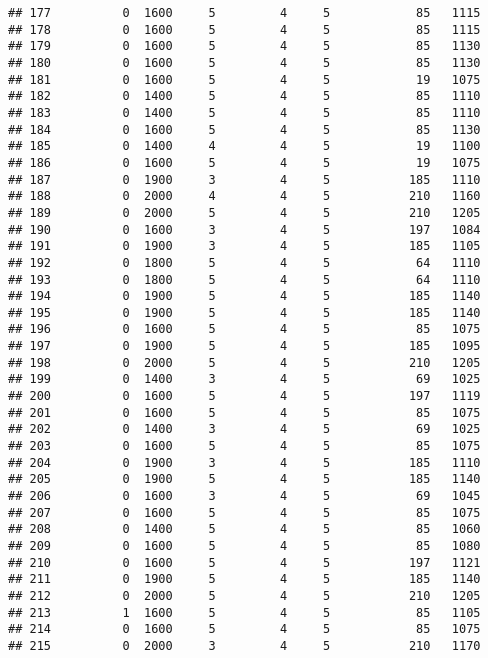 \documentclass[]{article}
\begin{document}
\begin{verbatim}
## 177          0  1600     5         4     5            85   1115
## 178          0  1600     5         4     5            85   1115
## 179          0  1600     5         4     5            85   1130
## 180          0  1600     5         4     5            85   1130
## 181          0  1600     5         4     5            19   1075
## 182          0  1400     5         4     5            85   1110
## 183          0  1400     5         4     5            85   1110
## 184          0  1600     5         4     5            85   1130
## 185          0  1400     4         4     5            19   1100
## 186          0  1600     5         4     5            19   1075
## 187          0  1900     3         4     5           185   1110
## 188          0  2000     4         4     5           210   1160
## 189          0  2000     5         4     5           210   1205
## 190          0  1600     3         4     5           197   1084
## 191          0  1900     3         4     5           185   1105
## 192          0  1800     5         4     5            64   1110
## 193          0  1800     5         4     5            64   1110
## 194          0  1900     5         4     5           185   1140
## 195          0  1900     5         4     5           185   1140
## 196          0  1600     5         4     5            85   1075
## 197          0  1900     5         4     5           185   1095
## 198          0  2000     5         4     5           210   1205
## 199          0  1400     3         4     5            69   1025
## 200          0  1600     5         4     5           197   1119
## 201          0  1600     5         4     5            85   1075
## 202          0  1400     3         4     5            69   1025
## 203          0  1600     5         4     5            85   1075
## 204          0  1900     3         4     5           185   1110
## 205          0  1900     5         4     5           185   1140
## 206          0  1600     3         4     5            69   1045
## 207          0  1600     5         4     5            85   1075
## 208          0  1400     5         4     5            85   1060
## 209          0  1600     5         4     5            85   1080
## 210          0  1600     5         4     5           197   1121
## 211          0  1900     5         4     5           185   1140
## 212          0  2000     5         4     5           210   1205
## 213          1  1600     5         4     5            85   1105
## 214          0  1600     5         4     5            85   1075
## 215          0  2000     3         4     5           210   1170

\end{verbatim}
\end{document}
